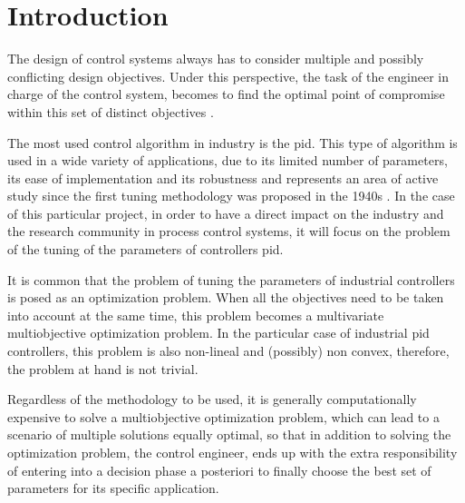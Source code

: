 \chapter{Introduction}
\begin{refsection}
\label{sec:Antecedentes}
The design of control systems always has to consider multiple and possibly conflicting design objectives. Under this perspective, the task of the engineer in charge of the control system, becomes to find the optimal point of compromise within this set of distinct objectives \parencite{Garpinger2012}.

The most used control algorithm in industry is the \gls{pid}. This type of algorithm is used in a wide variety of applications, due to its limited number of parameters, its ease of implementation and its robustness \parencite{Astrom2005} and represents an area of active study since the first tuning methodology was proposed in the 1940s \parencite{Ziegler1942}. In the case of this particular project, in order to have a direct impact on the industry and the research community in process control systems, it will focus on the problem of the tuning of the parameters of controllers \gls{pid}.

It is common that the problem of tuning the parameters of industrial controllers is posed as an optimization problem. When all the objectives need to be taken into account at the same time, this problem becomes a multivariate multiobjective optimization problem. In the particular case of industrial \gls{pid} controllers, this problem is also non-lineal and (possibly) non convex, therefore, the problem at hand is not trivial.

Regardless of the methodology to be used, it is generally computationally expensive to solve a multiobjective optimization problem, which can lead to a scenario of multiple solutions equally optimal, so that in addition to solving the optimization problem, the control engineer, ends up with the extra responsibility of entering into a decision phase a posteriori to finally choose the best set of parameters for its specific application.


\end{refsection}
